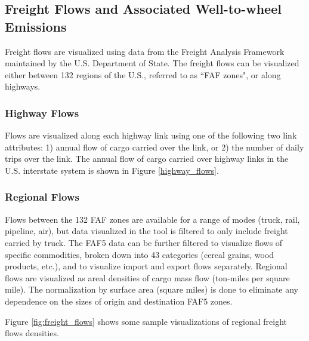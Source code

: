 \subsection{Freight Flows and Associated Well-to-wheel Emissions}

Freight flows are visualized using data from the Freight Analysis Framework \cite{faf5_2024} maintained by the U.S. Department of State. The freight flows can be visualized either between 132 regions of the U.S., referred to as ``FAF zones", or along highways. 

\subsubsection{Highway Flows}
Flows are visualized along each highway link using one of the following two link attributes: 1) annual flow of cargo carried over the link, or 2) the number of daily trips over the link. The annual flow of cargo carried over highway links in the U.S. interstate system is shown in Figure \ref{highway_flows}.

\subsubsection{Regional Flows}
Flows between the 132 FAF zones are available for a range of modes (truck, rail, pipeline, air), but data visualized in the tool is filtered to only include freight carried by truck. The FAF5 data can be further filtered to visualize flows of specific commodities, broken down into 43 categories (cereal grains, wood products, etc.), and to visualize import and export flows separately. Regional  flows are visualized as areal densities of cargo mass flow (ton-miles per square mile). The normalization by surface area (square miles) is done to eliminate any dependence on the sizes of origin and destination FAF5 zones. 

Figure \ref{fig:freight_flows} shows some sample visualizations of regional freight flows densities. 

